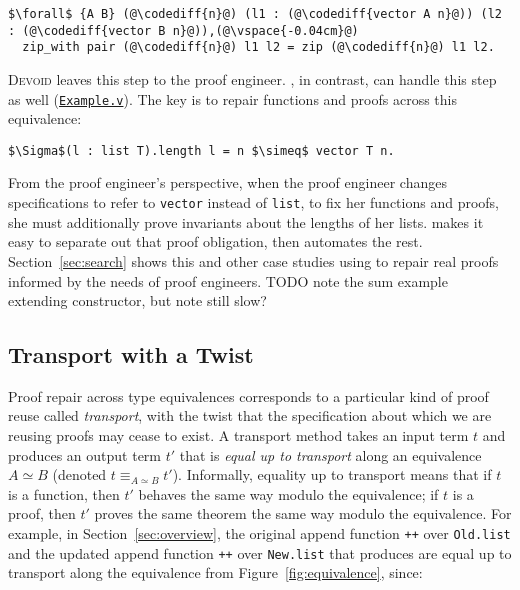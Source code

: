 \begin{lstlisting}
$\forall$ {A B} (@\codediff{n}@) (l1 : (@\codediff{vector A n}@)) (l2 : (@\codediff{vector B n}@)),(@\vspace{-0.04cm}@)
  zip_with pair (@\codediff{n}@) l1 l2 = zip (@\codediff{n}@) l1 l2.
\end{lstlisting}

\textsc{Devoid} leaves this step to the proof engineer.
\toolname, in contrast, can handle this step as well (\href{https://github.com/uwplse/pumpkin-pi/blob/master/plugin/coq/examples/Example.v}{\lstinline{Example.v}}).
The key is to repair functions and proofs across this equivalence:

\begin{lstlisting}
$\Sigma$(l : list T).length l = n $\simeq$ vector T n.
\end{lstlisting}
From the proof engineer's perspective, when the proof engineer changes specifications to refer to \lstinline{vector} instead of \lstinline{list},
to fix her functions and proofs, she must additionally prove invariants about the lengths of her lists.
\toolname makes it easy to separate out that proof obligation, then automates the rest.
Section~\ref{sec:search} shows this and other case studies using \toolname to repair real proofs
informed by the needs of proof engineers.
TODO note the sum example extending constructor, but note still slow?


\subsection{Transport with a Twist}
\label{sec:repair}

Proof repair across type equivalences corresponds to a particular kind of proof reuse called \textit{transport},
with the twist that the specification about which we are reusing proofs may cease to exist.
A transport method takes an input term $t$ and produces an output term $t'$ that is \textit{equal up to transport}
along an equivalence $A \simeq B$ (denoted $t \equiv_{A \simeq B} t'$).
Informally, equality up to transport means that if $t$ is a function, then $t'$ behaves the same way modulo the equivalence;
if $t$ is a proof, then $t'$ proves the same theorem the same way modulo the equivalence.
For example, in Section~\ref{sec:overview}, the original append function \lstinline{++} over \lstinline{Old.list}
and the updated append function \lstinline{++} over \lstinline{New.list} that \toolname produces are
equal up to transport along the equivalence from Figure~\ref{fig:equivalence}, since:

